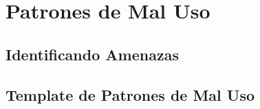 \chapter{Patrones de Mal Uso}
\label{chap5:MisusePatt}

\section{Identificando Amenazas}
\label{chap5:IdenThreat}


\section{Template de Patrones de Mal Uso}
\label{chap5:TemplateMP}





